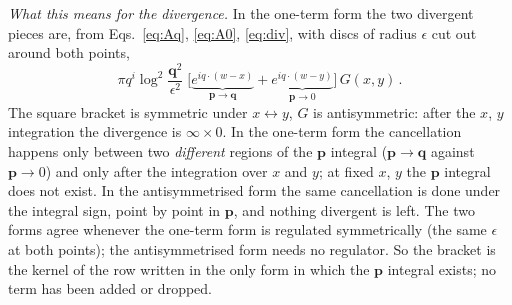 \documentclass[11pt]{article}
\newcommand{\vq}{\mathbf{q}}
\newcommand{\vp}{\mathbf{p}}
\begin{document}
\emph{What this means for the divergence.} In the one-term form the two divergent pieces are, from Eqs.~\eqref{eq:Aq}, \eqref{eq:A0}, \eqref{eq:div}, with discs of radius $\epsilon$ cut out around both points,
\begin{equation}
\pi q^{i}\log^{2}\frac{\vq^{2}}{\epsilon^{2}}\;\Big[\underbrace{e^{iq\cdot(w-x)}}_{\vp\to\vq}+\underbrace{e^{iq\cdot(w-y)}}_{\vp\to0}\Big]\,G(x,y)\,.
\end{equation}
The square bracket is symmetric under $x\leftrightarrow y$, $G$ is antisymmetric: after the $x$, $y$ integration the divergence is $\infty\times0$. In the one-term form the cancellation happens only between two \emph{different} regions of the $\vp$ integral ($\vp\to\vq$ against $\vp\to0$) and only after the integration over $x$ and $y$; at fixed $x$, $y$ the $\vp$ integral does not exist. In the antisymmetrised form the same cancellation is done under the integral sign, point by point in $\vp$, and nothing divergent is left. The two forms agree whenever the one-term form is regulated symmetrically (the same $\epsilon$ at both points); the antisymmetrised form needs no regulator. So the bracket is the kernel of the row written in the only form in which the $\vp$ integral exists; no term has been added or dropped.
\end{document}
